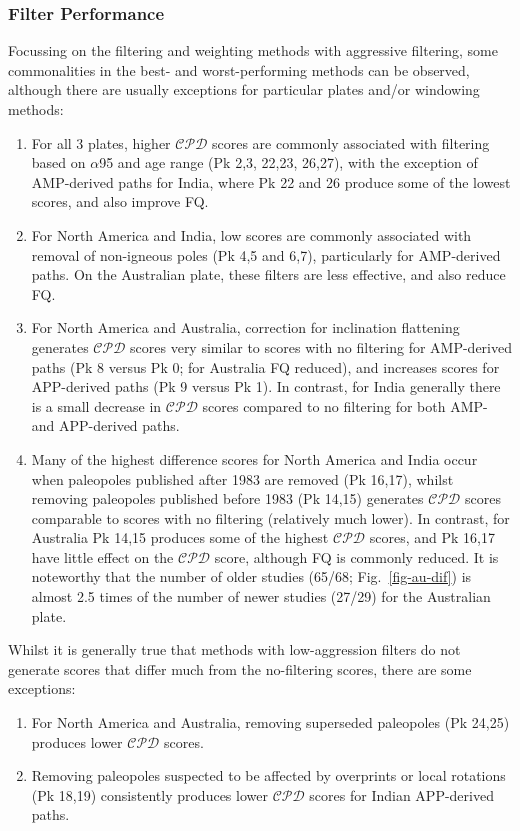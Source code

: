 \subsubsection{Filter Performance}

Focussing on the filtering and weighting methods with aggressive filtering,
some commonalities in the best- and worst-performing methods can be observed,
although there are usually exceptions for particular plates and/or windowing
methods:
%
\begin{enumerate}
  \item For all 3 plates, higher $\mathcal{CPD}$ scores are commonly associated
		with filtering based on $\alpha$95 and age range (Pk 2,3, 22,23, 26,27),
		with the exception of AMP-derived paths for India, where Pk 22 and 26
		produce some of the lowest scores, and also improve FQ\@.
  \item For North America and India, low scores are commonly associated with
		removal of non-igneous poles (Pk 4,5 and 6,7), particularly for
		AMP-derived paths. On the Australian plate, these filters are less
		effective, and also reduce FQ\@.
  \item For North America and Australia, correction for inclination flattening
		generates $\mathcal{CPD}$ scores very similar to scores with no
		filtering for AMP-derived paths (Pk 8 versus Pk 0; for Australia FQ
		reduced), and increases scores for APP-derived paths (Pk 9 versus Pk 1).
		In contrast, for India generally there is a small decrease in
		$\mathcal{CPD}$ scores compared to no filtering for both AMP- and
		APP-derived paths.
  \item Many of the highest difference scores for North America and India occur
		when paleopoles published after 1983 are removed (Pk 16,17), whilst
		removing paleopoles published before 1983 (Pk 14,15) generates
		$\mathcal{CPD}$ scores comparable to scores with no filtering
		(relatively much lower). In contrast, for Australia Pk 14,15
		produces some of the highest $\mathcal{CPD}$ scores, and Pk 16,17
		have little effect on the $\mathcal{CPD}$ score, although FQ is
		commonly reduced. It is noteworthy that the number of older studies
		(65/68; Fig.~\ref{fig-au-dif}) is almost 2.5 times of the number of
		newer studies (27/29) for the Australian plate.
\end{enumerate}

Whilst it is generally true that methods with low-aggression filters do not
generate scores that differ much from the no-filtering scores, there are some
exceptions:
%
\begin{enumerate}
  \item For North America and Australia, removing superseded paleopoles (Pk
		24,25) produces lower $\mathcal{CPD}$ scores.
  \item Removing paleopoles suspected to be affected by overprints or local
		rotations (Pk 18,19) consistently produces lower
		$\mathcal{CPD}$ scores for Indian APP-derived paths.
\end{enumerate}

